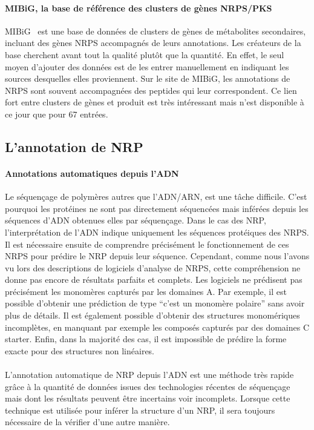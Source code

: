 \documentclass[12pt,french,twoside]{report}
\begin{document}
\paragraph{MIBiG, la base de référence des clusters de gènes NRPS/PKS}
MIBiG~\cite{medema_minimum_2015} est une base de données de clusters de gènes de métabolites secondaires, incluant des gènes NRPS accompagnés de leurs annotations.
Les créateurs de la base cherchent avant tout la qualité plutôt que la quantité.
En effet, le seul moyen d'ajouter des données est de les entrer manuellement en indiquant les sources desquelles elles proviennent.
Sur le site de MIBiG, les annotations de NRPS sont souvent accompagnées des peptides qui leur correspondent.
Ce lien fort entre clusters de gènes et produit est très intéressant mais n'est disponible à ce jour que pour 67 entrées.



\subsection{L'annotation de NRP}

\paragraph{Annotations automatiques depuis l'ADN}
Le séquençage de polymères autres que l'ADN/ARN, est une tâche difficile.
C'est pourquoi les protéines ne sont pas directement séquencées mais inférées depuis les séquences d'ADN obtenues elles par séquençage.
Dans le cas des NRP, l'interprétation de l'ADN indique uniquement les séquences protéiques des NRPS.
Il est nécessaire ensuite de comprendre précisément le fonctionnement de ces NRPS pour prédire le NRP depuis leur séquence.
Cependant, comme nous l'avons vu lors des descriptions de logiciels d'analyse de NRPS, cette compréhension ne donne pas encore de résultats parfaits et complets.
Les logiciels ne prédisent pas précisément les monomères capturés par les domaines A.
Par exemple, il est possible d'obtenir une prédiction de type ``c'est un monomère polaire'' sans avoir plus de détails.
Il est également possible d'obtenir des structures monomériques incomplètes, en manquant par exemple les composés capturés par des domaines C starter.
Enfin, dans la majorité des cas, il est impossible de prédire la forme exacte pour des structures non linéaires.

\paragraph{}L'annotation automatique de NRP depuis l'ADN est une méthode très rapide grâce à la quantité de données issues des technologies récentes de séquençage mais dont les résultats peuvent être incertains voir incomplets.
Lorsque cette technique est utilisée pour inférer la structure d'un NRP, il sera toujours nécessaire de la vérifier d'une autre manière.
\end{document}
